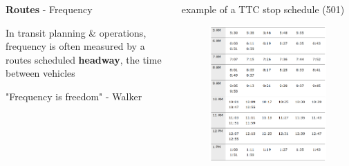 \documentclass[aspectratio=169]{beamer}
\begin{document}
\begin{frame}
	
	
	
	
	\begin{columns}
		\begin{column}{0.5\textwidth}
			
			\textbf{Routes} - Frequency
			
			\vspace{4mm}
			
			In transit planning \& operations, frequency is often measured by a routes scheduled \textbf{headway}, the time between vehicles
			
			\vspace{4mm}
			
			"Frequency is freedom" - Walker
			
			
		\end{column}
		
		\begin{column}{0.5\textwidth}
			\small example of a TTC stop schedule (501)
			\begin{figure}
				\centering
				\includegraphics[width=1\linewidth]{images/ttc_schedule_eg.png}
			\end{figure}
			
		\end{column}
		
	\end{columns}
	
\end{frame}
\end{document}
